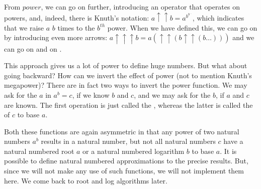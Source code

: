 \documentclass{scrreprt}
\newcommand{\Varid}[1]{\mathit{#1}}
\begin{document}
From \ensuremath{\Varid{power}}, we can go on further,
introducing an operator that operates on powers,
and, indeed, there is Knuth's  notation:
$a \uparrow\uparrow b = a^{b^{b^{\dots}}}$, which
indicates that we raise $a$ $b$ times to the $b^{th}$ power. 
When we have defined this, 
we can go on by introducing even more arrows:
$a \uparrow\uparrow\uparrow b = a(\uparrow\uparrow (b \uparrow\uparrow (b \dots)))$
and we can go on and on .

This approach gives us a lot of power
to define huge numbers.
But what about going backward?
How can we invert the effect of power 
(not to mention Knuth's megapower)?
There are in fact two ways to invert
the power function.
We may ask for the  $a$ in $a^b = c$,
if we know $b$ and $c$,
and we may ask for the  $b$,
if $a$ and $c$ are known.
The first operation is just called the ,
whereas the latter is called the 
of $c$ to base $a$.

Both these functions are again asymmetric
in that any power of two natural numbers $a^b$
results in a natural number, but
not all natural numbers $c$
have a natural numbered root $a$
or a natural numbered logarithm $b$ to base $a$.
It is possible to define natural numbered 
approximations to the precise results.
But, since we will not make any use of such functions,
we will not implement them here.
We come back to root and log algorithms later.
\end{document}
